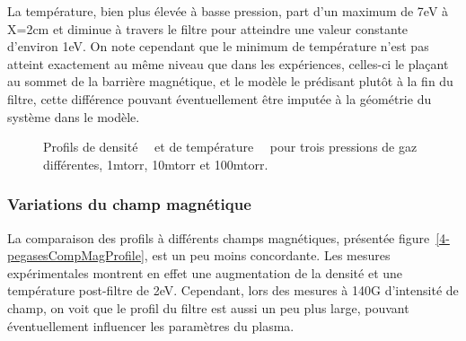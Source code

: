 \begin{refsection}
	La température, bien plus élevée à basse pression, part d'un maximum de 7eV à
	X=2cm et diminue à travers le filtre pour atteindre une valeur constante
	d'environ 1eV. On note cependant que le minimum de température n'est pas
	atteint exactement au même niveau que dans les expériences, celles-ci le
	plaçant au sommet de la barrière magnétique, et le modèle le
	prédisant plutôt à la fin du filtre, cette différence pouvant éventuellement
	être imputée à la géométrie du système dans le modèle.

\begin{figure}[htbp]
  \centering
    \caption{Profils de densité~~ et de
    température~~ pour trois pressions de
    gaz différentes, 1mtorr, 10mtorr et 100mtorr.}
    \label{pegasesCompPressProfils}
\end{figure}

	\subsubsection{Variations du champ magnétique}
	
	La comparaison des profils à différents champs magnétiques, présentée
	figure~\ref{4-pegasesCompMagProfile}, est un peu moins concordante. Les mesures
	expérimentales montrent en effet une augmentation de la densité et une
	température post-filtre de 2eV. Cependant, lors des mesures à 140G
	d'intensité de champ, on voit que le profil du filtre est aussi un peu plus
	large, pouvant éventuellement influencer les paramètres du plasma.
	

\end{refsection}
